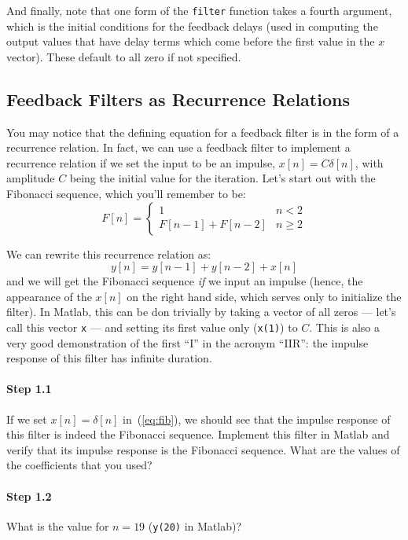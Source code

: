 And finally, note that one form of the \verb|filter| function takes a
fourth argument, which is the initial conditions for the feedback
delays (used in computing the output values that have delay terms
which come before the first value in the $x$ vector). These default to
all zero if not specified. 

\subsection{Feedback Filters as Recurrence Relations}

You may notice that the defining equation for a feedback filter is in
the form of a recurrence relation. In fact, we can use a feedback
filter to implement a recurrence relation if we set the input to be
an impulse, $x[n] = C \delta[n]$, with amplitude $C$ being the initial
value for the iteration. Let's start out with the Fibonacci sequence,
which you'll remember to be:
\begin{equation}
  F[n] = \left\{ \begin{array}{ll}
      1 & n < 2 \\
      F[n-1] + F[n-2] & n \geq 2
    \end{array} \right.
\end{equation}

We can rewrite this recurrence relation as:
\begin{equation}
  y[n] = y[n-1] + y[n-2] + x[n]
  \label{eq:fib}
\end{equation}
and we will get the Fibonacci sequence \emph{if} we input an impulse
(hence, the appearance of the $x[n]$ on the right hand side, which
serves only to initialize the filter). In Matlab, this can be don
trivially by taking a vector of all zeros --- let's call this vector
\verb|x| --- and setting its first value only (\verb|x(1)|) to
$C$. This is also a very good demonstration of the first ``I'' in the
acronym ``IIR'': the impulse response of this filter has infinite
duration.

\paragraph{Step 1.1} If we set $x[n]=\delta[n]$ in~(\ref{eq:fib}), we
should see that the impulse response of this filter is indeed the
Fibonacci sequence. Implement this filter in Matlab and verify that its
impulse response is the Fibonacci sequence. What are the values of the
coefficients that you used?


\paragraph{Step 1.2} What is the value for $n=19$ (\verb|y(20)| in
Matlab)?


